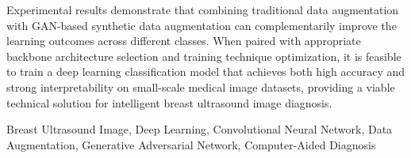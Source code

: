 Experimental results demonstrate that combining traditional data augmentation with GAN-based synthetic data augmentation can complementarily improve the learning outcomes across different classes. When paired with appropriate backbone architecture selection and training technique optimization, it is feasible to train a deep learning classification model that achieves both high accuracy and strong interpretability on small-scale medical image datasets, providing a viable technical solution for intelligent breast ultrasound image diagnosis.


\vspace{5pt}

\keywordsen Breast Ultrasound Image, Deep Learning, Convolutional Neural Network, Data Augmentation, Generative Adversarial Network, Computer-Aided Diagnosis
